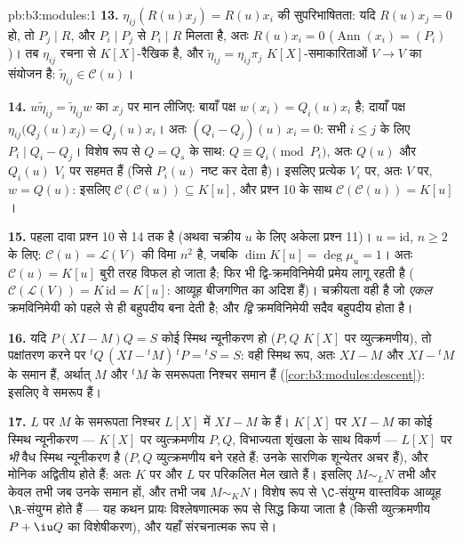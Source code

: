 \begin{solution}{pb:b3:modules:1}
\textbf{13.} $\eta_{ij}(R(u)x_j) = R(u)x_i$ की सुपरिभाषितता: यदि $R(u)x_j = 0$ हो, तो $P_j \mid R$, और $P_i \mid P_j$
से $P_i \mid R$ मिलता है, अतः $R(u)x_i = 0$ ($\operatorname{Ann}(x_i) =
(P_i)$)। तब $\eta_{ij}$ रचना से $K[X]$-रैखिक
है, और $\tilde\eta_{ij} = \eta_{ij}\pi_j$ $K[X]$-समाकारिताओं $V \to V$ का संयोजन है: $\tilde\eta_{ij} \in \mathcal
C(u)$।

\textbf{14.} $w\tilde\eta_{ij} = \tilde\eta_{ij}w$ का $x_j$ पर मान लीजिए: बायाँ पक्ष $w(x_i) = Q_i(u)x_i$ है; दायाँ
पक्ष $\eta_{ij}\bigl(Q_j(u)x_j\bigr) = Q_j(u)x_i$। अतः $(Q_i -
Q_j)(u)\,x_i = 0$: सभी $i \leq j$ के लिए $P_i \mid Q_i - Q_j$। विशेष रूप से $Q = Q_s$
के साथ: $Q \equiv Q_i \pmod{P_i}$, अतः $Q(u)$ और $Q_i(u)$ $V_i$ पर सहमत हैं (जिसे $P_i(u)$
नष्ट कर देता है)। इसलिए प्रत्येक $V_i$ पर, अतः $V$ पर, $w
= Q(u)$:
इसलिए $\mathcal C(\mathcal C(u))
\subseteq K[u]$, और प्रश्न 10 के साथ $\mathcal C(\mathcal
C(u)) = K[u]$।

\textbf{15.} पहला दावा प्रश्न 10 से 14 तक है (अथवा चक्रीय $u$ के
लिए अकेला प्रश्न 11)। $u = \mathrm{id}$, $n \geq
2$ के लिए: $\mathcal C(u) = \mathcal L(V)$ की विमा $n^2$ है,
जबकि $\dim K[u] = \deg\mu_u = 1$। अतः $\mathcal C(u) = K[u]$ बुरी तरह विफल हो जाता है; फिर भी द्वि-क्रमविनिमेयी
प्रमेय लागू रहती है ($\mathcal C(\mathcal L(V)) = K\,\mathrm{id} = K[u]$: आव्यूह बीजगणित का  अदिश हैं)।
चक्रीयता वही है जो \emph{एकल} क्रमविनिमेयी को पहले से ही बहुपदीय
बना देती है; और \emph{द्वि} क्रमविनिमेयी सदैव बहुपदीय होता है।

\textbf{16.} यदि $P(XI - M)Q = S$ कोई स्मिथ न्यूनीकरण हो ($P, Q$ $K[X]$ पर
व्युत्क्रमणीय), तो पक्षांतरण करने पर ${}^tQ\,(XI -
{}^tM)\,{}^tP = {}^tS = S$: वही स्मिथ रूप, अतः $XI - M$
और $XI - {}^tM$ के  समान हैं, अर्थात् $M$ और ${}^tM$ के
समरूपता निश्चर समान हैं (\cref{cor:b3:modules:descent}): इसलिए वे समरूप हैं।

\textbf{17.} $L$ पर $M$ के समरूपता निश्चर $L[X]$ में $XI - M$ के
 हैं। $K[X]$ पर $XI - M$ का कोई स्मिथ न्यूनीकरण ---
$K[X]$ पर व्युत्क्रमणीय $P, Q$, विभाज्यता शृंखला के साथ विकर्ण ---
$L[X]$ पर \emph{भी} वैध स्मिथ न्यूनीकरण है ($P, Q$ व्युत्क्रमणीय बने
रहते हैं: उनके सारणिक शून्येतर अचर हैं), और मोनिक 
अद्वितीय होते हैं: अतः $K$ पर और $L$ पर परिकलित 
मेल खाते हैं। इसलिए $M \sim_L N$ तभी और केवल तभी जब उनके 
समान हों, और तभी जब $M \sim_K N$। विशेष रूप से $\C$-संयुग्म वास्तविक आव्यूह
$\R$-संयुग्म होते हैं --- यह कथन प्रायः विश्लेषणात्मक रूप से सिद्ध
किया जाता है (किसी व्युत्क्रमणीय $P + \iu
Q$ का विशेषीकरण), और यहाँ
संरचनात्मक रूप से।


\end{solution}
